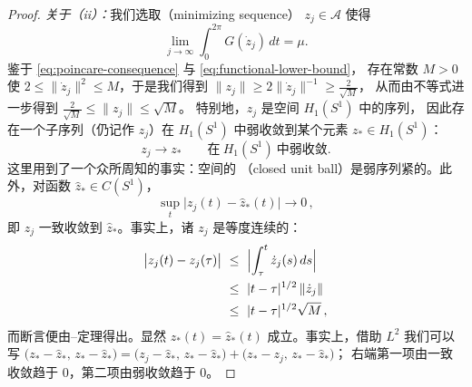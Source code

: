\begin{proof}
\medskip
\noindent\emph{关于（ii）：}我们选取\textbf{\trMinimizingSequence}（minimizing sequence）%
$z_{j}\in\mathcal{A}$ 使得
\begin{equation}\label{eq:minimizing-sequence}
\lim_{j\to\infty}\int_{0}^{2\pi}G(\dot{z}_{j})\,dt=\mu.
\end{equation}
鉴于 \eqref{eq:poincare-consequence} 与 \eqref{eq:functional-lower-bound}，%
存在常数 $M>0$ 使 $2\leq\|\dot{z}_{j}\|^{2}\leq M$，于是我们得到%
$\|z_{j}\|\geq2\|\dot{z}_{j}\|^{-1}\geq\frac{2}{\sqrt{M}}$，%
从而由\trPoincare{}不等式进一步得到 $\frac{2}{\sqrt{M}}\leq\|z_{j}\|\leq\sqrt{M}$。%
特别地，$z_{j}$ 是\trHilbert{}空间 $H_{1}(S^{1})$ 中的\trBounded{}序列，%
因此存在一个子序列（仍记作 $z_{j}$）在 $H_{1}(S^{1})$ 中弱收敛到某个元素%
$z_{*}\in H_{1}(S^{1})$：
\begin{equation}\label{eq:weak-convergence}
z_{j}\rightarrow z_{*}\qquad\text{在}\ H_{1}(S^{1})\ \text{中弱收敛}.
\end{equation}
这里用到了一个众所周知的事实：\trHilbert{}空间的\textbf{\trClosed\trUnitBall}%
（closed unit ball）是弱序列紧的。此外，对函数 $\hat{z}_{*}\in C(S^{1})$，
\begin{equation}\label{eq:uniform-convergence}
\sup_{t}\bigl|z_{j}(t)-\hat{z}_{*}(t)\bigr|\rightarrow0\,,
\end{equation}
即 $z_{j}$ 一致收敛到 $\hat{z}_{*}$。事实上，诸 $z_{j}$ 是等度连续的：
\begin{align*}
\bigl|z_{j}(t)-z_{j}(\tau)\bigr|\ &\leq\ \Bigl|\int_{\tau}^{t}\dot{z}_{j}(s)\,ds\Bigr|\\
&\leq\ |t-\tau|^{1/2}\,\|\dot{z}_{j}\|\\
&\leq\ |t-\tau|^{1/2}\sqrt{M}\,,
\end{align*}
而断言便由\trArzela{}--\trAscoli{}定理得出。显然 $z_{*}(t)=\hat{z}_{*}(t)$%
\trAlmostEverywhere{}成立。事实上，借助 $L^{2}$ \trInnerProduct{}我们可以写%
$\bigl(z_{*}-\hat{z}_{*},\,z_{*}-\hat{z}_{*}\bigr)=\bigl(z_{j}-\hat{z}_{*},\,z_{*}-\hat{z}_{*}\bigr)+\bigl(z_{*}-z_{j},\,z_{*}-\hat{z}_{*}\bigr)$；%
右端第一项由一致收敛趋于 $0$，第二项由弱收敛趋于 $0$。


\end{proof}
